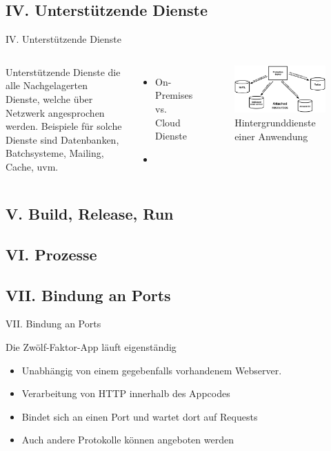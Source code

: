 \documentclass{beamer}
\begin{document}
			\subsection{IV. Unterstützende Dienste}
				\begin{frame}{IV. Unterstützende Dienste}
					\begin{columns}
					Unterstützende Dienste die alle Nachgelagerten Dienste, welche über Netzwerk angesprochen werden. Beispiele für solche Dienste sind Datenbanken, Batchsysteme, Mailing, Cache, uvm.
					\begin{itemize}
						\item On-Premises vs. Cloud Dienste
						\item 
					\end{itemize}
					\begin{figure}
						\includegraphics[width=\textwidth]{attached-resources.png}
						\caption{Hintergrunddienste einer Anwendung \cite{factor-subdienst}}
					\end{figure}
					\end{columns}
				\end{frame}
			\subsection{V. Build, Release, Run}
			\subsection{VI. Prozesse}
			\subsection{VII. Bindung an Ports}
				\begin{frame}{VII. Bindung an Ports}
					\begin{block}{Die Zwölf-Faktor-App läuft eigenständig}
						\begin{itemize}
							\item Unabhängig von einem gegebenfalls vorhandenem Webserver.
							\item Verarbeitung von HTTP innerhalb des Appcodes
							\item Bindet sich an einen Port und wartet dort auf Requests
							\item Auch andere Protokolle können angeboten werden
						\end{itemize}
					\end{block}
				\end{frame}
\end{document}
